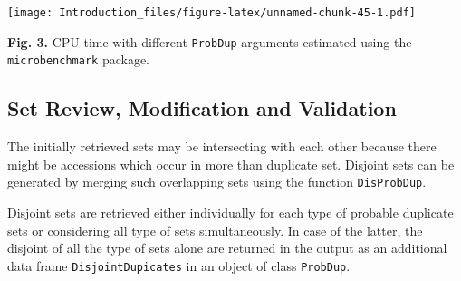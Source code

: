 \documentclass[]{article}
\newenvironment{Shaded}{\begin{snugshade}}{\end{snugshade}}
\newcommand{\CharTok}[1]{\textcolor[rgb]{0.31,0.60,0.02}{#1}}
\newcommand{\DataTypeTok}[1]{\textcolor[rgb]{0.13,0.29,0.53}{#1}}
\newcommand{\FloatTok}[1]{\textcolor[rgb]{0.00,0.00,0.81}{#1}}
\newcommand{\KeywordTok}[1]{\textcolor[rgb]{0.13,0.29,0.53}{\textbf{#1}}}
\newcommand{\NormalTok}[1]{#1}
\newcommand{\StringTok}[1]{\textcolor[rgb]{0.31,0.60,0.02}{#1}}
\begin{document}
\begin{Shaded}
\end{Shaded}

\texttt{[image: Introduction\_files/figure-latex/unnamed-chunk-45-1.pdf]}

\textbf{Fig. 3.} CPU time with different \texttt{ProbDup} arguments
estimated using the \texttt{microbenchmark} package.

\hypertarget{set-review-modification-and-validation}{%
\subsection{Set Review, Modification and
Validation}\label{set-review-modification-and-validation}}

The initially retrieved sets may be intersecting with each other because
there might be accessions which occur in more than duplicate set.
Disjoint sets can be generated by merging such overlapping sets using
the function \texttt{DisProbDup}.

Disjoint sets are retrieved either individually for each type of
probable duplicate sets or considering all type of sets simultaneously.
In case of the latter, the disjoint of all the type of sets alone are
returned in the output as an additional data frame
\texttt{DisjointDupicates} in an object of class \texttt{ProbDup}.
\end{document}
